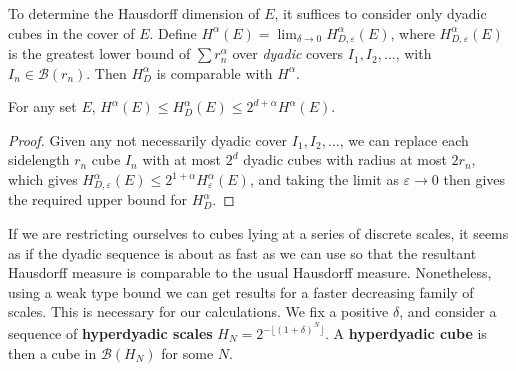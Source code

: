 To determine the Hausdorff dimension of $E$, it suffices to consider only dyadic cubes in the cover of $E$. Define $H^\alpha(E) = \lim_{\delta \to 0} H^\alpha_{D,\varepsilon}(E)$, where $H^\alpha_{D,\varepsilon}(E)$ is the greatest lower bound of $\sum r_n^\alpha$ over \emph{dyadic} covers $I_1, I_2, \dots$, with $I_n \in \mathcal{B}(r_n)$. Then $H^\alpha_D$ is comparable with $H^\alpha$.

\begin{theorem}
    For any set $E$, $H^\alpha(E) \leq H^\alpha_D(E) \leq 2^{d + \alpha} H^\alpha(E)$.
\end{theorem}
\begin{proof}
    Given any not necessarily dyadic cover $I_1, I_2, \dots$, we can replace each sidelength $r_n$ cube $I_n$ with at most $2^d$ dyadic cubes with radius at most $2r_n$, which gives $H^\alpha_{D,\varepsilon}(E) \leq 2^{1 + \alpha} H^\alpha_\varepsilon(E)$, and taking the limit as $\varepsilon \to 0$ then gives the required upper bound for $H^\alpha_D$.
\end{proof}

If we are restricting ourselves to cubes lying at a series of discrete scales, it seems as if the dyadic sequence is about as fast as we can use so that the resultant Hausdorff measure is comparable to the usual Hausdorff measure. Nonetheless, using a weak type bound we can get results for a faster decreasing family of scales. This is necessary for our calculations. We fix a positive $\delta$, and consider a sequence of {\bf hyperdyadic scales} $H_N = 2^{- \lfloor (1 + \delta)^N \rfloor}$. A {\bf hyperdyadic cube} is then a cube in $\mathcal{B}(H_N)$ for some $N$.



